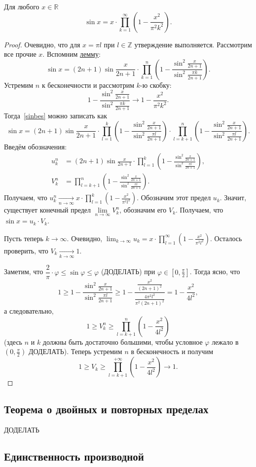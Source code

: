 \begin{theorem}
	Для любого \(x \in \mathbb{R}\) \[
	\sin x = x \cdot \prod_{k=1}^{\infty} \left(1 - \frac{x^2}{\pi^2 k^2} \right).
	\]
\end{theorem}
\begin{proof}
	Очевидно, что для \(x = \pi l\) при \(l \in \mathbb{Z}\) утверждение выполняется. Рассмотрим все прочие \(x\). Вспомним \hyperlink{sinlem}{лемму}:
	\begin{equation} \label{sinbes}
		\sin x = (2n + 1) \sin \frac{x}{2n + 1} \cdot \prod_{k=1}^{n} \left(1 - \frac{\sin^2 \frac{x}{2n + 1}}{\sin^2 \frac{\pi k}{2n + 1}} \right).
	\end{equation}
	Устремим \(n\) к бесконечности и рассмотрим \(k\)-ю скобку: \[
	1 - \frac{\sin^2 \frac{x}{2n + 1}}{\sin^2 \frac{\pi k}{2n + 1}} \to 1 - \frac{x^2}{\pi^2 k^2}.
	\]
	Тогда~\eqref{sinbes} можно записать как \[
	\sin x = (2n + 1) \sin \frac{x}{2n + 1} \cdot \prod_{l=1}^{k} \left(1 - \frac{\sin^2 \frac{x}{2n + 1}}{\sin^2 \frac{\pi l}{2n + 1}} \right) \cdot \prod_{l=k+1}^{n} \left(1 - \frac{\sin^2 \frac{x}{2n + 1}}{\sin^2 \frac{\pi l}{2n + 1}} \right).
	\]
	Введём обозначения:
	\begin{align*}
		u_k^n &= (2n + 1) \sin \frac{x}{2n + 1} \cdot \prod_{l=1}^{k} \left(1 - \frac{\sin^2 \frac{x}{2n + 1}}{\sin^2 \frac{\pi l}{2n + 1}} \right), \\
		V_k^n &= \prod_{l=k+1}^{n} \left(1 - \frac{\sin^2 \frac{x}{2n + 1}}{\sin^2 \frac{\pi l}{2n + 1}} \right).
	\end{align*}
	Получаем, что \(\displaystyle u_k^n \xrightarrow[n \to \infty]{} x \cdot \prod_{l=1}^{k} \left(1 - \frac{x^2}{\pi^2 l^2} \right)\). Обозначим этот предел \(u_k\). Значит, существует конечный предел \(\lim\limits_{n \to \infty} V_k^n\), обозначим его \(V_k\). Получаем, что \(\sin x = u_k \cdot V_k\).
	
	Пусть теперь \(k \to \infty\). Очевидно, \(\displaystyle \lim_{k \to \infty} u_k = x \cdot \prod_{l=1}^{\infty} \left(1 - \frac{x^2}{\pi^2 l^2} \right)\). Осталось проверить, что \(V_k \xrightarrow[k \to \infty]{} 1\).
	
	Заметим, что \(\dfrac{2}{\pi} \cdot \varphi \leqslant \sin \varphi \leqslant \varphi\) (ДОДЕЛАТЬ) при \(\varphi \in \left[0, \frac{\pi}{2} \right]\). Тогда ясно, что \[
	1 \geqslant 1 - \frac{\sin^2 \frac{x}{2n + 1}}{\sin^2 \frac{\pi l}{2n + 1}} \geqslant 1 - \frac{\frac{x^2}{(2n + 1)^2}}{\frac{4 \pi^2 l^2}{\pi^2 (2n + 1)^2}} = 1 - \frac{x^2}{4 l^2},
	\]
	а следовательно, \[
	1 \geqslant V_k^n \geqslant \prod_{l=k+1}^{n} \left(1 - \frac{x^2}{4 l^2} \right)
	\]
	(здесь \(n\) и \(k\) должны быть достаточно большими, чтобы условное \(\varphi\) лежало в \(\left(0, \frac{\pi}{2} \right)\) ДОДЕЛАТЬ).
	Теперь устремим \(n\) в бесконечность и получим \[
	1 \geqslant V_k \geqslant \prod_{l=k+1}^{+\infty} \left(1 - \frac{x^2}{4 l^2} \right) \to 1.
	\]
\end{proof}

\subsection{Теорема о двойных и повторных пределах}

ДОДЕЛАТЬ

\subsection{Единственность производной}

